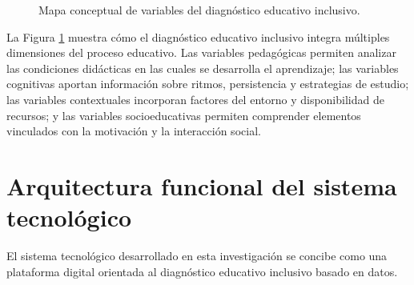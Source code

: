 \begin{refsection}
\begin{figure}[htbp]
{
}

\caption{Mapa conceptual de variables del diagnóstico educativo inclusivo.}
\label{fig:variables-diagnostico}
\end{figure}

La Figura \ref{fig:variables-diagnostico} muestra cómo el diagnóstico educativo inclusivo integra múltiples dimensiones del proceso educativo. Las variables pedagógicas permiten analizar las condiciones didácticas en las cuales se desarrolla el aprendizaje; las variables cognitivas aportan información sobre ritmos, persistencia y estrategias de estudio; las variables contextuales incorporan factores del entorno y disponibilidad de recursos; y las variables socioeducativas permiten comprender elementos vinculados con la motivación y la interacción social.

\section{Arquitectura funcional del sistema tecnológico}

El sistema tecnológico desarrollado en esta investigación se concibe como una plataforma digital orientada al diagnóstico educativo inclusivo basado en datos.


\end{refsection}
